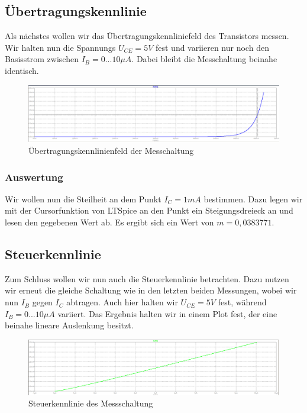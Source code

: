 \documentclass{article}
\begin{document}
\subsection{Übertragungskennlinie}
\label{sec:ubertr}

Als nächstes wollen wir das Übertragungskennliniefeld des Transistors messen. Wir halten nun die Spannungs $U_{CE} = 5V$ fest und variieren nur noch den Basisstrom zwischen $I_{B} = 0...10\mu A$. Dabei bleibt die Messchaltung beinahe identisch.

\begin{figure}[h]
  \centering
  \includegraphics[width=\textwidth]{../assets/images/EL1P3/uebertragungskennlinie.png}
  \caption{Übertragungskennlinienfeld der Messchaltung}
  \label{fig:uebertragungskennlinie}
\end{figure}

\subsubsection{Auswertung}

Wir wollen nun die Steilheit an dem Punkt $I_{C} = 1mA$ bestimmen. Dazu legen wir mit der Cursorfunktion von LTSpice an den Punkt ein Steigungsdreieck an und lesen den gegebenen Wert ab. Es ergibt sich ein Wert von $m = 0,0383771$.

\newpage

\subsection{Steuerkennlinie}

\label{sec:steuerkennlinie}

Zum Schluss wollen wir nun auch die Steuerkennlinie betrachten. Dazu nutzen wir erneut die gleiche Schaltung wie in den letzten beiden Messungen, wobei wir nun $I_{B}$ gegen $I_{C}$ abtragen. Auch hier halten wir $U_{CE} = 5V$ fest, während $I_{B} = 0...10\mu A$ variiert. Das Ergebnis halten wir in einem Plot fest, der eine beinahe lineare Auslenkung besitzt.

\begin{figure}[h]
  \centering
  \includegraphics[width=\textwidth]{../assets/images/EL1P3/steuerkennlinie.png}
  \caption{Steuerkennlinie des Messschaltung}
  \label{fig:steuer}
\end{figure}
\newpage
\end{document}
